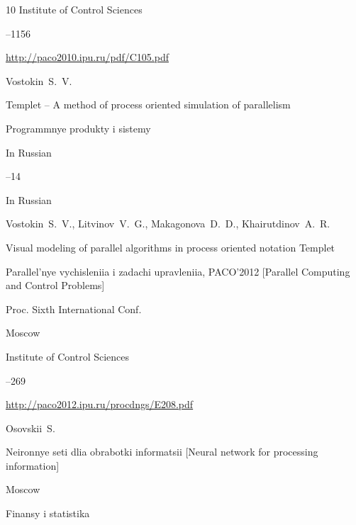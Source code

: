 \begin{thebibliography}{10}
\publ Institute of Control Sciences


--1156

\url{http://paco2010.ipu.ru/pdf/C105.pdf}




\by Vostokin~S.~V.

\paper Templet – A method of process oriented simulation of parallelism

\jour Programm\-nye produkty i sistemy



\lang In Russian

--14








\lang In Russian

\by Vostokin~S.~V., Litvinov~V.~G., Makagonova~D.~D., Khairutdinov~A.~R.

\paper Visual modeling of parallel algorithms in process oriented notation Templet

\inbook Parallel'nye vychisleniia i zadachi upravleniia, \rm PACO’2012 \rm [Parallel Computing and Control Problems]

\bookinfo Proc. Sixth International Conf.

\publaddr Moscow

\publ Institute of Control Sciences



--269

\url{http://paco2012.ipu.ru/procdngs/E208.pdf}














\by Osovskii~S.

\book Neironnye seti dlia obrabotki informatsii \rm [Neural network for processing information]

\publaddr Moscow

\publ Finansy i statistika


\end{thebibliography}
